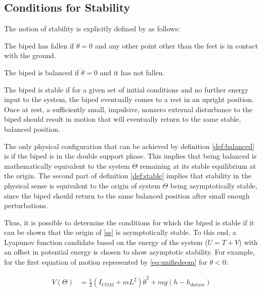 \subsection{Conditions for Stability}
The notion of stability is explicitly defined by \cite{Wight:2008vt} as follows: 

\hrulefill

\begin{definition} \label{def:fallen}
	The biped has fallen if $\dot{\theta} = 0$ and any other point other than the feet is in contact with the ground. 
\end{definition}

\begin{definition} \label{def:balanced}
	The biped is balanced if $\dot{\theta} = 0$ and it has not fallen. 
\end{definition}

\begin{definition} \label{def:stable}
	The biped is stable if for a given set of initial conditions and no further energy input to the system, the biped eventually comes to a rest in an upright position. Once at rest, a sufficiently small, impulsive, nonzero external disturbance to the biped should result in motion that will eventually return to the same stable, balanced position. 
\end{definition}

\hrulefill

The only physical configuration that can be achieved by definition \ref{def:balanced} is if the biped is in the double support phase. This implies that being balanced is mathematically equivalent to the system $\dot{\Theta}$ remaining at its stable equilibrium at the origin. The second part of definition \ref{def:stable} implies that stability in the physical sense is equivalent to the origin of system $\dot{\Theta}$ being asymptotically stable, since the biped should return to the same balanced position after small enough perturbations.

Thus, it is possible to determine the conditions for which the biped is stable if it can be shown that the origin of \eqref{ss} is asymptotically stable. To this end, a Lyapunov function candidate based on the energy of the system ($U = T + V$) with an offset in potential energy is chosen to show asymptotic stability. For example, for the first equation of motion represented by \eqref{eq:unifiedeom} for $\theta < 0$: 

\begin{equation}
	\begin{aligned}
		V(\Theta) &= {\frac{1}{2}({I_{COM}} + m{L^2}){\dot \theta ^2} + mg(h - {h_{datum}})}	
		\end{aligned}
\end{equation}

